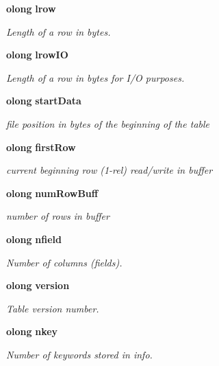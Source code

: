 \begin{CompactItemize}
{\bf olong} {\bf lrow}
\begin{CompactList}\small\item\em Length of a row in bytes. \item\end{CompactList}\item 
{\bf olong} {\bf lrow\-IO}
\begin{CompactList}\small\item\em Length of a row in bytes for I/O purposes. \item\end{CompactList}\item 
{\bf olong} {\bf start\-Data}
\begin{CompactList}\small\item\em file position in bytes of the beginning of the table \item\end{CompactList}\item 
{\bf olong} {\bf first\-Row}
\begin{CompactList}\small\item\em current beginning row (1-rel) read/write in buffer \item\end{CompactList}\item 
{\bf olong} {\bf num\-Row\-Buff}
\begin{CompactList}\small\item\em number of rows in buffer \item\end{CompactList}\item 
{\bf olong} {\bf nfield}
\begin{CompactList}\small\item\em Number of columns (fields). \item\end{CompactList}\item 
{\bf olong} {\bf version}
\begin{CompactList}\small\item\em Table version number. \item\end{CompactList}\item 
{\bf olong} {\bf nkey}
\begin{CompactList}\small\item\em Number of keywords stored in info. \item\end{CompactList}\item 

\end{CompactItemize}
